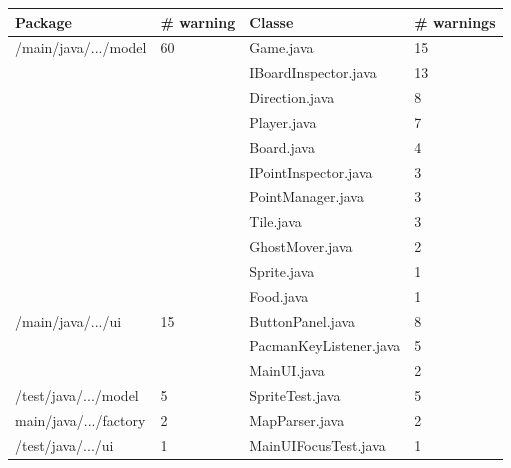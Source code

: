 \documentclass[12pt,a4paper,final]{article}
\begin{document}
\begin{tabular}{|l|l|l|l|}
\hline
Package & \# warning & Classe & \# warnings \\
\hline
/main/java/.../model & 60 & Game.java & 15 \\
&& IBoardInspector.java & 13 \\
&& Direction.java & 8 \\
&& Player.java & 7 \\
&& Board.java & 4 \\
&& IPointInspector.java & 3 \\
&& PointManager.java & 3 \\
&& Tile.java & 3 \\
&& GhostMover.java & 2 \\
&& Sprite.java & 1 \\
&& Food.java & 1 \\
\hline
/main/java/.../ui & 15 & ButtonPanel.java & 8 \\
&& PacmanKeyListener.java & 5 \\
&& MainUI.java & 2 \\
\hline
/test/java/.../model & 5 & SpriteTest.java & 5 \\
\hline
main/java/.../factory & 2 & MapParser.java & 2 \\
\hline
/test/java/.../ui & 1 & MainUIFocusTest.java & 1 \\
\hline
\end{tabular}
\end{document}
